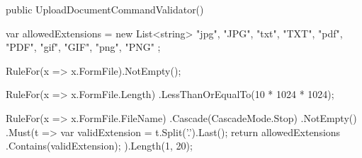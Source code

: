 \begin{spverbatim}
    public UploadDocumentCommandValidator()
    {
        var allowedExtensions = new List<string>
        {
            "jpg", "JPG", "txt", "TXT", "pdf",
            "PDF", "gif", "GIF", "png", "PNG"
        };

        RuleFor(x => x.FormFile).NotEmpty();

        RuleFor(x => x.FormFile.Length)
            .LessThanOrEqualTo(10 * 1024 * 1024);

        RuleFor(x => x.FormFile.FileName)
            .Cascade(CascadeMode.Stop)
            .NotEmpty()
            .Must(t =>
            {
                var validExtension = t.Split('.').Last();
                return allowedExtensions
                .Contains(validExtension);
            }).Length(1, 20);
    }
\end{spverbatim}